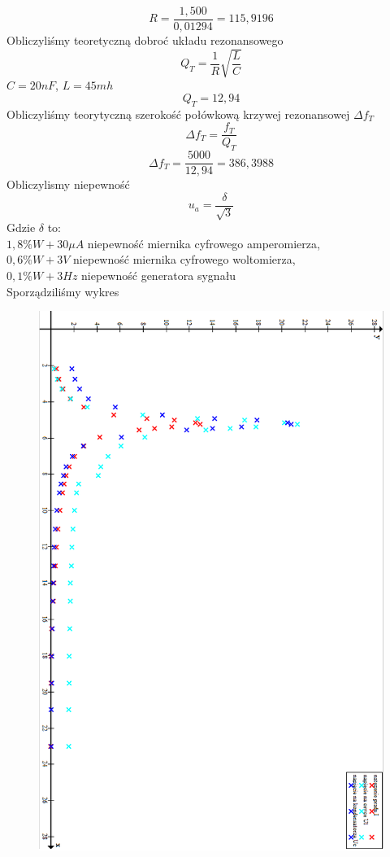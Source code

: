 \documentclass{article}
\begin{document}
$$R = \frac{1,500}{0,01294} = 115,9196$$
Obliczyliśmy teoretyczną dobroć układu rezonansowego
$$Q_T = \frac{1}{R}\sqrt{\frac{L}{C}}$$ 
$C = 20nF$,  $L=45mh$
$$Q_T = 12,94$$ 
Obliczyliśmy teorytyczną szerokość połówkową krzywej rezonansowej $\Delta f_T$
$$\Delta f_T = \frac{f_T}{Q_T}$$
$$\Delta f_T = \frac{5000}{12,94} = 386,3988$$
Obliczylismy niepewność 
$$u_a = \frac{\delta}{\sqrt{3}} $$
Gdzie $\delta$ to:\\
$1,8\% W + 30\mu A$ niepewność miernika cyfrowego amperomierza,\\
$0,6\% W + 3V$ niepewność miernika cyfrowego woltomierza,\\
$0,1\% W + 3Hz$ niepewność generatora sygnału\\
Sporządziliśmy wykres\\

\begin{figure}
\centering
\includegraphics[width=15cm]{wykresrezo.png}
\end{figure}
\newpage
\end{document}
